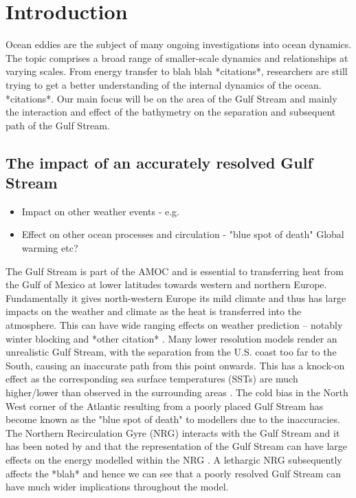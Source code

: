 \documentclass[..\EOYR.tex]{subfiles}
\begin{document}
\section{Introduction}

Ocean eddies are the subject of many ongoing investigations into ocean dynamics. The topic comprises a broad range of smaller-scale dynamics and relationships at varying scales. From energy transfer to blah blah *citations*, researchers are still trying to get a better understanding of the internal dynamics of the ocean. *citations*. Our main focus will be on the area of the Gulf Stream and mainly the interaction and effect of the bathymetry on the separation and subsequent path of the Gulf Stream.

\subsection{The impact of an accurately resolved Gulf Stream}
\begin{itemize}
  \item Impact on other weather events - e.g.  \citep{Scaife2011a}
  \item Effect on other ocean processes and circulation - "blue spot of death"    
  \todo Global warming etc?
\end{itemize}
The Gulf Stream is part of the AMOC and is essential to transferring heat from the Gulf of Mexico at lower latitudes towards western and northern Europe. Fundamentally it gives north-western Europe its mild climate and thus has large impacts on the weather and climate as the heat is transferred into the atmosphere. This can have wide ranging effects on weather prediction – notably winter blocking \citep{Scaife2011a} and *other citation* . Many lower resolution models render an unrealistic Gulf Stream, with the separation from the U.S. coast too far to the South, causing an inaccurate path from this point onwards. This has a knock-on effect as the corresponding sea surface temperatures (SSTs) are much higher/lower than observed in the surrounding areas \citep{Greatbatch2004}. The cold bias in the North West corner of the Atlantic resulting from a poorly placed Gulf Stream has become known as the "blue spot of death" \citep{Gnanadesikan2007} to modellers due to the inaccuracies.  The Northern Recirculation Gyre (NRG) interacts with the Gulf Stream and it has been noted by \citep{Zhang2007} and \citep{Ezer2016b} that the representation of the Gulf Stream can have large effects on the energy modelled within the NRG . A lethargic NRG subsequently affects the *blah* and hence we can see that a poorly resolved Gulf Stream can have much wider implications throughout the model.
\end{document}
